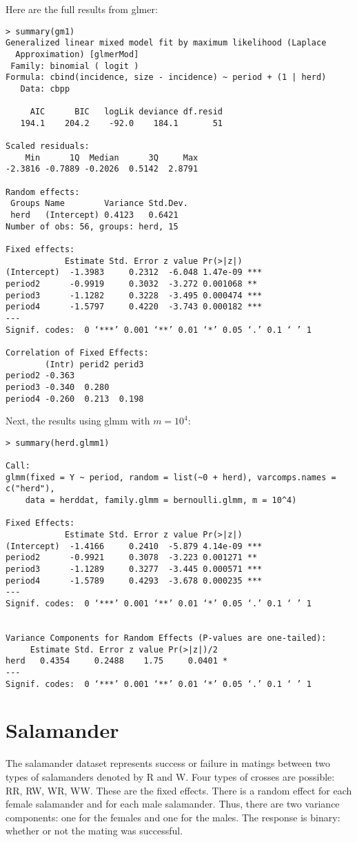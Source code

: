 \documentclass{article}
\begin{document}
Here are the full results from glmer:
\begin{verbatim}
> summary(gm1)
Generalized linear mixed model fit by maximum likelihood (Laplace
  Approximation) [glmerMod]
 Family: binomial ( logit )
Formula: cbind(incidence, size - incidence) ~ period + (1 | herd)
   Data: cbpp

     AIC      BIC   logLik deviance df.resid 
   194.1    204.2    -92.0    184.1       51 

Scaled residuals: 
    Min      1Q  Median      3Q     Max 
-2.3816 -0.7889 -0.2026  0.5142  2.8791 

Random effects:
 Groups Name        Variance Std.Dev.
 herd   (Intercept) 0.4123   0.6421  
Number of obs: 56, groups: herd, 15

Fixed effects:
            Estimate Std. Error z value Pr(>|z|)    
(Intercept)  -1.3983     0.2312  -6.048 1.47e-09 ***
period2      -0.9919     0.3032  -3.272 0.001068 ** 
period3      -1.1282     0.3228  -3.495 0.000474 ***
period4      -1.5797     0.4220  -3.743 0.000182 ***
---
Signif. codes:  0 ‘***’ 0.001 ‘**’ 0.01 ‘*’ 0.05 ‘.’ 0.1 ‘ ’ 1

Correlation of Fixed Effects:
        (Intr) perid2 perid3
period2 -0.363              
period3 -0.340  0.280       
period4 -0.260  0.213  0.198

\end{verbatim}

Next, the results using glmm with $m=10^4$:
\begin{verbatim}
> summary(herd.glmm1)

Call:
glmm(fixed = Y ~ period, random = list(~0 + herd), varcomps.names = c("herd"), 
    data = herddat, family.glmm = bernoulli.glmm, m = 10^4)

Fixed Effects:
            Estimate Std. Error z value Pr(>|z|)    
(Intercept)  -1.4166     0.2410  -5.879 4.14e-09 ***
period2      -0.9921     0.3078  -3.223 0.001271 ** 
period3      -1.1289     0.3277  -3.445 0.000571 ***
period4      -1.5789     0.4293  -3.678 0.000235 ***
---
Signif. codes:  0 ‘***’ 0.001 ‘**’ 0.01 ‘*’ 0.05 ‘.’ 0.1 ‘ ’ 1


Variance Components for Random Effects (P-values are one-tailed):
     Estimate Std. Error z value Pr(>|z|)/2  
herd   0.4354     0.2488    1.75     0.0401 *
---
Signif. codes:  0 ‘***’ 0.001 ‘**’ 0.01 ‘*’ 0.05 ‘.’ 0.1 ‘ ’ 1

\end{verbatim}


\section{Salamander}
The salamander dataset represents success or failure in matings between two types of salamanders denoted by R and W. Four types of crosses are possible: RR, RW, WR, WW. These are the fixed effects. There is a random effect for each female salamander and for each male salamander. Thus, there are two variance components: one for the females and one for the males. The response is binary: whether or not the mating was successful.
\end{document}
